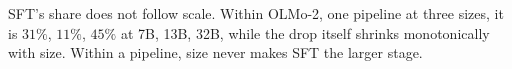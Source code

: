 SFT's share does not follow scale. Within OLMo-2, one pipeline at three sizes, it is $31\%$, $11\%$, $45\%$ at 7B, 13B, 32B, while the drop itself shrinks monotonically with size. Within a pipeline, size never makes SFT the larger stage.
